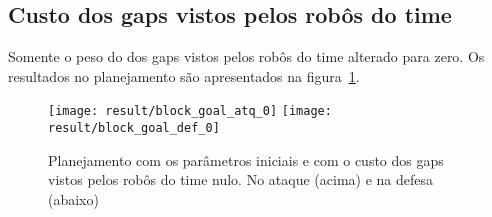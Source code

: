 \subsection{Custo dos gaps vistos pelos robôs do time}
Somente o peso do dos gaps vistos pelos robôs do time
alterado para zero. Os resultados no planejamento são
apresentados na figura~\ref{fig:block_goal_0}.

\begin{figure}[H]
  \centering
  \texttt{[image: result/block\_goal\_atq\_0]}
  \texttt{[image: result/block\_goal\_def\_0]}
  \caption{Planejamento com os parâmetros iniciais e com o custo
           dos gaps vistos pelos robôs do time nulo.
           No ataque (acima) e na defesa (abaixo)}\label{fig:block_goal_0}
\end{figure}
